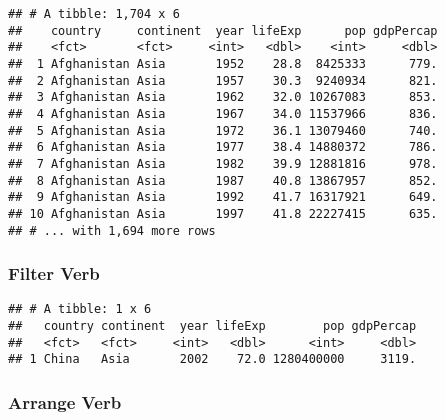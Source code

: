 \documentclass[
]{article}
\newenvironment{Shaded}{\begin{snugshade}}{\end{snugshade}}
\newcommand{\CommentTok}[1]{\textcolor[rgb]{0.56,0.35,0.01}{\textit{#1}}}
\newcommand{\DecValTok}[1]{\textcolor[rgb]{0.00,0.00,0.81}{#1}}
\newcommand{\KeywordTok}[1]{\textcolor[rgb]{0.13,0.29,0.53}{\textbf{#1}}}
\newcommand{\NormalTok}[1]{#1}
\newcommand{\OperatorTok}[1]{\textcolor[rgb]{0.81,0.36,0.00}{\textbf{#1}}}
\newcommand{\StringTok}[1]{\textcolor[rgb]{0.31,0.60,0.02}{#1}}
\begin{document}
\begin{verbatim}
## # A tibble: 1,704 x 6
##    country     continent  year lifeExp      pop gdpPercap
##    <fct>       <fct>     <int>   <dbl>    <int>     <dbl>
##  1 Afghanistan Asia       1952    28.8  8425333      779.
##  2 Afghanistan Asia       1957    30.3  9240934      821.
##  3 Afghanistan Asia       1962    32.0 10267083      853.
##  4 Afghanistan Asia       1967    34.0 11537966      836.
##  5 Afghanistan Asia       1972    36.1 13079460      740.
##  6 Afghanistan Asia       1977    38.4 14880372      786.
##  7 Afghanistan Asia       1982    39.9 12881816      978.
##  8 Afghanistan Asia       1987    40.8 13867957      852.
##  9 Afghanistan Asia       1992    41.7 16317921      649.
## 10 Afghanistan Asia       1997    41.8 22227415      635.
## # ... with 1,694 more rows
\end{verbatim}

\hypertarget{filter-verb}{%
\subsubsection{Filter Verb}\label{filter-verb}}

\begin{Shaded}
\end{Shaded}

\begin{verbatim}
## # A tibble: 1 x 6
##   country continent  year lifeExp        pop gdpPercap
##   <fct>   <fct>     <int>   <dbl>      <int>     <dbl>
## 1 China   Asia       2002    72.0 1280400000     3119.
\end{verbatim}

\hypertarget{arrange-verb}{%
\subsubsection{Arrange Verb}\label{arrange-verb}}

\begin{Shaded}
\end{Shaded}
\end{document}
